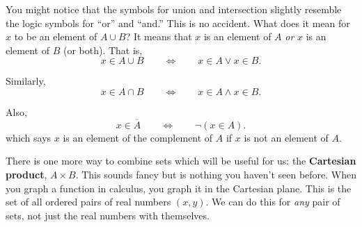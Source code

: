 \documentclass[10pt,]{book}
\newcommand{\terminology}[1]{\textbf{#1}}
\theoremstyle{plain}
\theoremstyle{definition}
\theoremstyle{definition}
\theoremstyle{definition}
\numberwithin{equation}{chapter}
\def\Iff{\Leftrightarrow}
\renewcommand{\bar}{\overline}
\begin{document}
      You might notice that the symbols for union and intersection slightly resemble the logic symbols for ``or'' and ``and.'' This is no accident. What does it mean for \(x\) to be an element of \(A\cup B\)? It means that \(x\) is an element of \(A\) \emph{or} \(x\) is an element of \(B\) (or both). That is,
      \begin{equation*}
        x \in A \cup B \qquad \Iff \qquad x \in A \vee x \in B.
      \end{equation*}
\par

      Similarly,
      \begin{equation*}
        x \in A \cap B \qquad \Iff \qquad x \in A \wedge x \in B.
      \end{equation*}
\par

      Also,
      \begin{equation*}
        x \in \bar A \qquad \Iff \qquad \neg (x \in A).
      \end{equation*}
      which says \(x\) is an element of the complement of \(A\) if \(x\) is not an element of \(A\).
\par

      There is one more way to combine sets which will be useful for us: the \terminology{Cartesian product}, \(A \times B\). This sounds fancy but is nothing you haven't seen before. When you graph a function in calculus, you graph it in the Cartesian plane. This is the set of all ordered pairs of real numbers \((x,y)\). We can do this for \emph{any} pair of sets, not just the real numbers with themselves.
\par
\end{document}
